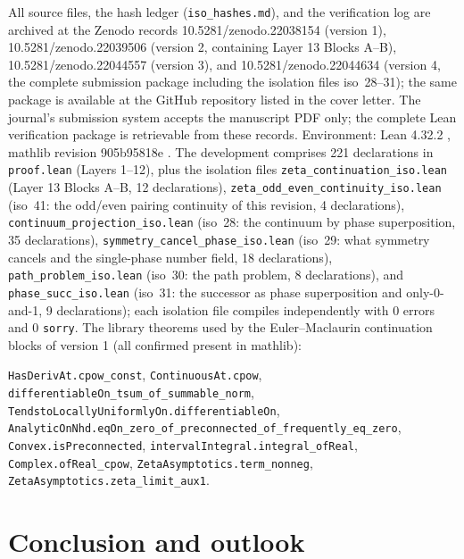 \documentclass{article}
\begin{document}
All source files, the hash ledger (\texttt{iso\_hashes.md}), and the
verification log are archived at the Zenodo records
10.5281/zenodo.22038154 (version 1),
10.5281/zenodo.22039506 (version 2, containing Layer 13 Blocks A--B),
10.5281/zenodo.22044557 (version 3), and
10.5281/zenodo.22044634 (version 4, the complete submission package
including the isolation files iso~28--31); the same package is
available at the GitHub repository listed in the cover letter. The
journal's submission system accepts the manuscript PDF only; the
complete Lean verification package is retrievable from these records.
Environment: Lean 4.32.2 \cite{lean}, mathlib revision 905b95818e
\cite{mathlib}. The development
comprises 221 declarations in \texttt{proof.lean} (Layers 1--12), plus the
isolation files \texttt{zeta\_continuation\_iso.lean} (Layer 13 Blocks A--B,
12 declarations), \texttt{zeta\_odd\_even\_continuity\_iso.lean} (iso~41:
the odd/even pairing continuity of this revision, 4 declarations),
\texttt{continuum\_projection\_iso.lean}
(iso~28: the continuum by phase superposition, 35 declarations),
\texttt{symmetry\_cancel\_phase\_iso.lean} (iso~29: what symmetry cancels
and the single-phase number field, 18 declarations),
\texttt{path\_problem\_iso.lean} (iso~30: the path problem, 8
declarations), and \texttt{phase\_succ\_iso.lean} (iso~31: the
successor as phase superposition and only-0-and-1, 9 declarations);
each isolation file
compiles independently with
0 errors and 0 \texttt{sorry}. The library theorems used by the Euler--Maclaurin
continuation blocks of version 1 (all confirmed present in mathlib):
{\small\begin{sloppypar}\texttt{HasDerivAt.cpow\_const},
\texttt{ContinuousAt.cpow}, \texttt{differentiableOn\_tsum\_of\_summable\_norm},
\texttt{TendstoLocallyUniformlyOn.differentiableOn},
\texttt{AnalyticOnNhd.eqOn\_zero\_of\_preconnected\_of\_frequently\_eq\_zero},
\texttt{Convex.isPreconnected}, \texttt{intervalIntegral.integral\_ofReal},
\texttt{Complex.ofReal\_cpow}, \texttt{ZetaAsymptotics.term\_nonneg},
\texttt{ZetaAsymptotics.zeta\_limit\_aux1}.\end{sloppypar}}

\section{Conclusion and outlook}
\label{sec:conclusion}
\end{document}
